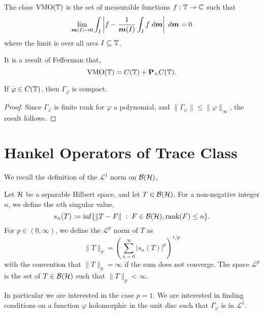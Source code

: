 \begin{proposition}
\label{feffVMO}
    The class $\operatorname{VMO}(\mathbb{T})$ is the set of measurable functions $f:\mathbb{T}\rightarrow\mathbb{C}$
    such that
    \begin{equation*}
        \lim_{\boldsymbol{m}(I)\rightarrow0} \int_I \left|f-\frac{1}{\boldsymbol{m}(I)}\int_I f\;d\boldsymbol{m}\right|\;d\boldsymbol{m} = 0
    \end{equation*}
    where the limit is over all arcs $I \subseteq \mathbb{T}$. 
    
    It is a result of Fefferman \cite{fefferman} that,
    \begin{equation*}
        \operatorname{VMO}(\mathbb{T}) = C(\mathbb{T})+\mathbf{P}_+C(\mathbb{T}).
    \end{equation*}
\end{proposition}   

\begin{corollary}
    If $\varphi \in C(\mathbb{T})$, then $\Gamma_\varphi$ is compact.
\end{corollary}
\begin{proof}
    Since $\Gamma_\varphi$ is finite rank for $\varphi$ a polynomial,
    and $\|\Gamma_\varphi\| \leq \|\varphi\|_\infty$, the result follows.
\end{proof} 

\section{Hankel Operators of Trace Class}
We recall the definition of the $\mathcal{L}^1$ norm on $\mathcal{B}(\mathcal{H})$,
\begin{definition}
    Let $\mathcal{H}$ be a separable Hilbert space, and let $T \in \mathcal{B}(\mathcal{H})$. 
    For a non-negative integer $n$, we define the $n$th singular value,
    \begin{equation*}
        s_n(T) := \inf\{\|T-F\| \;:\;F \in \mathcal{B}(\mathcal{H}),\operatorname{rank}(F) \leq n\}.
    \end{equation*}
    For $p \in (0,\infty)$, we define the $\mathcal{L}^p$ norm of $T$
    as
    \begin{equation*}
        \|T\|_p = \left(\sum_{n=0}^\infty |s_n(T)|^p\right)^{1/p}
    \end{equation*}
    with the convention that $\|T\|_p = \infty$ if the sum does not
    converge. The space $\mathcal{L}^p$ is the set of $T \in \mathcal{B}(\mathcal{H})$
    such that $\|T\|_p < \infty$.
\end{definition}



In particular we are interested in the case $p = 1$. We are interested
in finding conditions on a function $\varphi$ holomorphic in the unit disc
such that $\Gamma_\varphi$ is in $\mathcal{L}^1$. 

